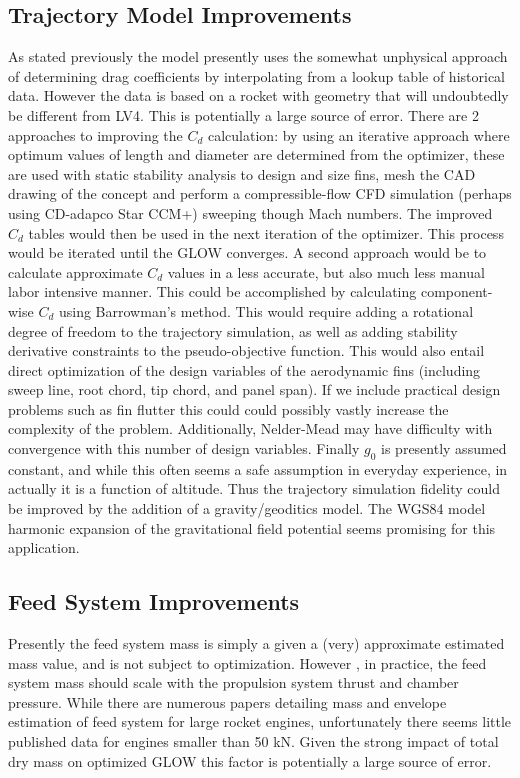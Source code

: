 \documentclass[]{aiaa-tc}%
\begin{document}
\subsection{Trajectory Model Improvements}
As stated previously the model presently uses the somewhat unphysical approach of determining drag coefficients by interpolating from a lookup table of historical data. However the data is based on a rocket with geometry that will undoubtedly be different from LV4. This is potentially a large source of error. There are 2 approaches to improving the $C_d$ calculation: by using an iterative approach where optimum values of length and diameter are determined from the optimizer, these are used with static stability analysis to design and size fins, mesh the CAD drawing of the concept and perform a compressible-flow CFD simulation (perhaps using CD-adapco Star CCM+) sweeping though Mach numbers. The improved $C_d$ tables would then be used in the next iteration of the optimizer. This process would be iterated until the GLOW converges. A second approach would be to calculate approximate $C_d$ values in a less accurate, but also much less manual labor intensive manner. This could be accomplished by calculating component-wise $C_d$ using Barrowman's method\cite{barrowman}. This would require adding a rotational degree of freedom to the trajectory simulation, as well as adding stability derivative constraints to the pseudo-objective function. This would also entail direct optimization of the design variables of the aerodynamic fins (including sweep line, root chord, tip chord, and panel span). If we include practical design problems such as fin flutter this could could possibly vastly increase the complexity of the problem. Additionally, Nelder-Mead may have difficulty with convergence with this number of design variables. Finally $g_0$ is presently assumed constant, and while this often seems a safe assumption in everyday experience, in actually it is a function of altitude. Thus the trajectory simulation fidelity could be improved by the addition of a gravity/geoditics model. The WGS84 model harmonic expansion of the gravitational field potential seems promising for this application. 

\subsection{Feed System Improvements}
Presently the feed system mass is simply a given a (very) approximate estimated mass value, and is not subject to optimization. However , in practice, the feed system mass should scale with the propulsion system thrust and chamber pressure. While there are numerous papers detailing mass and envelope estimation of feed system for large rocket engines, unfortunately there seems little published data for engines smaller than 50 kN. Given the strong impact of total dry mass on optimized GLOW this factor is potentially a large source of error.
\end{document}
